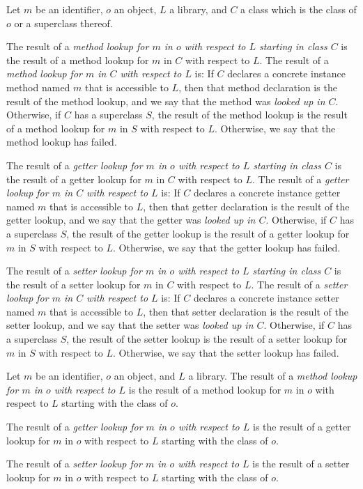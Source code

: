 \documentclass[makeidx]{article}
\begin{document}
{

{ %

\def\LookupDefinitionWithStart#1{
\LMHash{}%
The result of a
{\em {#1} lookup for $m$ in $o$ with respect to $L$ starting in class $C$}
is the result of a {#1} lookup for $m$ in $C$ with respect to $L$.
The result of a {\em {#1} lookup for $m$ in $C$ with respect to $L$} is:
If $C$ declares a concrete instance {#1} named $m$
that is accessible to $L$,
then that {#1} declaration is the result of the {#1} lookup,
and we say that the {#1} was {\em looked up in $C$}.
Otherwise, if $C$ has a superclass $S$,
the result of the {#1} lookup is
the result of a {#1} lookup for $m$ in $S$ with respect to $L$.
Otherwise, we say that the {#1} lookup has failed.

}

\LMHash{}%
Let $m$ be an identifier, $o$ an object, $L$ a library,
and $C$ a class which is the class of $o$ or a superclass thereof.

\LookupDefinitionWithStart{method}
\LookupDefinitionWithStart{getter}
\LookupDefinitionWithStart{setter}

\def\LookupDefinition#1{%
The result of a
{\em {#1} lookup for $m$ in $o$ with respect to $L$}
is the result of a
{#1} lookup for $m$ in $o$ with respect to $L$
starting with the class of $o$.
}

\LMHash{}%
Let $m$ be an identifier, $o$ an object, and $L$ a library.
\LookupDefinition{method}
\LookupDefinition{getter}
\LookupDefinition{setter}

} %





}
\end{document}
